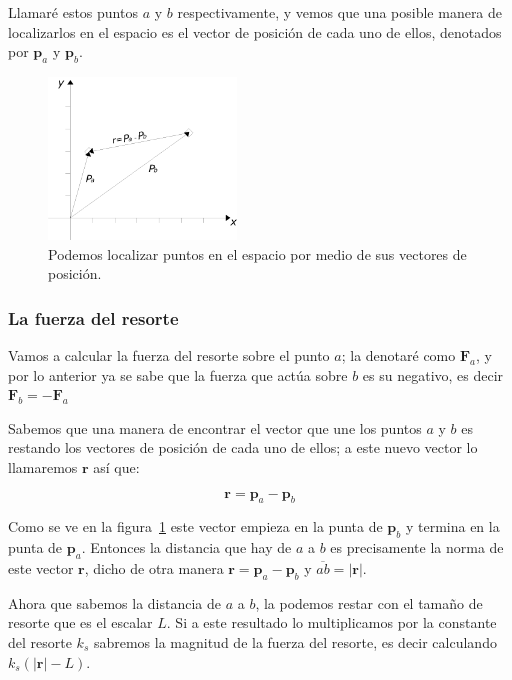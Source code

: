 Llamaré estos puntos $a$ y $b$ respectivamente, y vemos que una posible manera de localizarlos en el espacio es el vector de posición de cada uno de ellos, denotados por $\textbf{p}_a$ y $\textbf{p}_b$.

\begin{figure}
 \centering
 \includegraphics[width=5cm]{Img/vector_posicion}
 \caption[Ejemplo de vectores de posición]{ 
 Podemos localizar puntos en el espacio por medio de sus vectores de posición.
 } \label{posVec:fig}
\end{figure}

\subsubsection{La fuerza del resorte}

Vamos a calcular la fuerza del resorte sobre el punto $a$; la denotaré como $\textbf{F}_a$, y por lo anterior ya se sabe que la fuerza que actúa sobre $b$ es su negativo, es decir $\textbf{F}_b = -\textbf{F}_a$

Sabemos que una manera de encontrar el vector que une los puntos $a$ y $b$ es restando los vectores de posición de cada uno de ellos; a este nuevo vector lo llamaremos $\textbf{r}$ así que:

\begin{equation}
\textbf{r} = \textbf{p}_a - \textbf{p}_b
\end{equation}

Como se ve en la figura~\ref{posVec:fig} este vector empieza en la punta de $\textbf{p}_b$ y termina en la punta de $\textbf{p}_a$.
Entonces la distancia que hay de $a$ a $b$ es precisamente la norma de este vector $\textbf{r}$, dicho de otra manera $\textbf{r} = \textbf{p}_a - \textbf{p}_b$ y $\overline{ab} = |\textbf{r}|$.

Ahora que sabemos la distancia de $a$ a $b$, la podemos restar con el tamaño de resorte que es el escalar $L$.
Si a este resultado lo multiplicamos por la constante del resorte $k_s$ sabremos la magnitud de la fuerza del resorte, es decir calculando $k_s \left( |\textbf{r}| - L \right)$.

